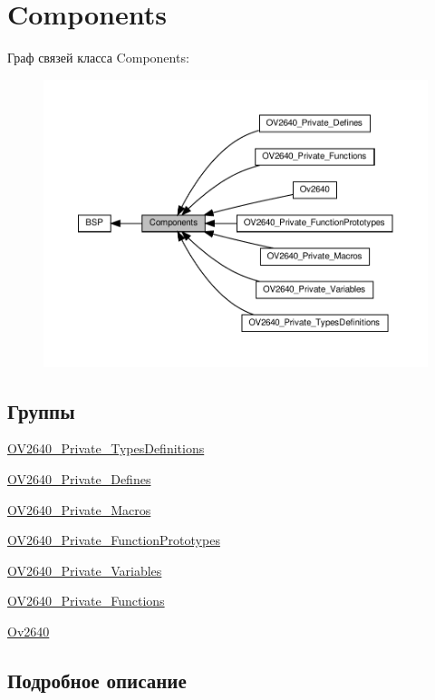 \hypertarget{group___components}{}\section{Components}
\label{group___components}
Граф связей класса Components\+:
\nopagebreak
\begin{figure}[H]
\begin{center}
\leavevmode
\includegraphics[width=350pt]{group___components}
\end{center}
\end{figure}
\subsection*{Группы}
\begin{DoxyCompactItemize}
\item 
\hyperlink{group___o_v2640___private___types_definitions}{O\+V2640\+\_\+\+Private\+\_\+\+Types\+Definitions}
\item 
\hyperlink{group___o_v2640___private___defines}{O\+V2640\+\_\+\+Private\+\_\+\+Defines}
\item 
\hyperlink{group___o_v2640___private___macros}{O\+V2640\+\_\+\+Private\+\_\+\+Macros}
\item 
\hyperlink{group___o_v2640___private___function_prototypes}{O\+V2640\+\_\+\+Private\+\_\+\+Function\+Prototypes}
\item 
\hyperlink{group___o_v2640___private___variables}{O\+V2640\+\_\+\+Private\+\_\+\+Variables}
\item 
\hyperlink{group___o_v2640___private___functions}{O\+V2640\+\_\+\+Private\+\_\+\+Functions}
\item 
\hyperlink{group__ov2640}{Ov2640}
\end{DoxyCompactItemize}


\subsection{Подробное описание}
